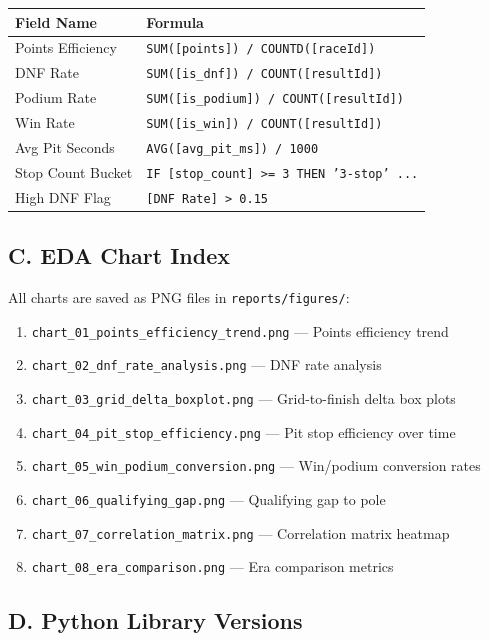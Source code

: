 \documentclass[12pt, a4paper]{article}
\begin{document}
\begin{longtable}{l l}
\toprule
\textbf{Field Name} & \textbf{Formula} \\
\midrule
Points Efficiency  & \texttt{SUM([points]) / COUNTD([raceId])} \\
DNF Rate           & \texttt{SUM([is\_dnf]) / COUNT([resultId])} \\
Podium Rate        & \texttt{SUM([is\_podium]) / COUNT([resultId])} \\
Win Rate           & \texttt{SUM([is\_win]) / COUNT([resultId])} \\
Avg Pit Seconds    & \texttt{AVG([avg\_pit\_ms]) / 1000} \\
Stop Count Bucket  & \texttt{IF [stop\_count] >= 3 THEN '3-stop' ...} \\
High DNF Flag      & \texttt{[DNF Rate] > 0.15} \\
\bottomrule
\end{longtable}

\subsection*{C. EDA Chart Index}
All charts are saved as PNG files in \texttt{reports/figures/}:

\begin{enumerate}[noitemsep]
    \item \texttt{chart\_01\_points\_efficiency\_trend.png} --- Points efficiency trend
    \item \texttt{chart\_02\_dnf\_rate\_analysis.png} --- DNF rate analysis
    \item \texttt{chart\_03\_grid\_delta\_boxplot.png} --- Grid-to-finish delta box plots
    \item \texttt{chart\_04\_pit\_stop\_efficiency.png} --- Pit stop efficiency over time
    \item \texttt{chart\_05\_win\_podium\_conversion.png} --- Win/podium conversion rates
    \item \texttt{chart\_06\_qualifying\_gap.png} --- Qualifying gap to pole
    \item \texttt{chart\_07\_correlation\_matrix.png} --- Correlation matrix heatmap
    \item \texttt{chart\_08\_era\_comparison.png} --- Era comparison metrics
\end{enumerate}

\subsection*{D. Python Library Versions}
\end{document}
